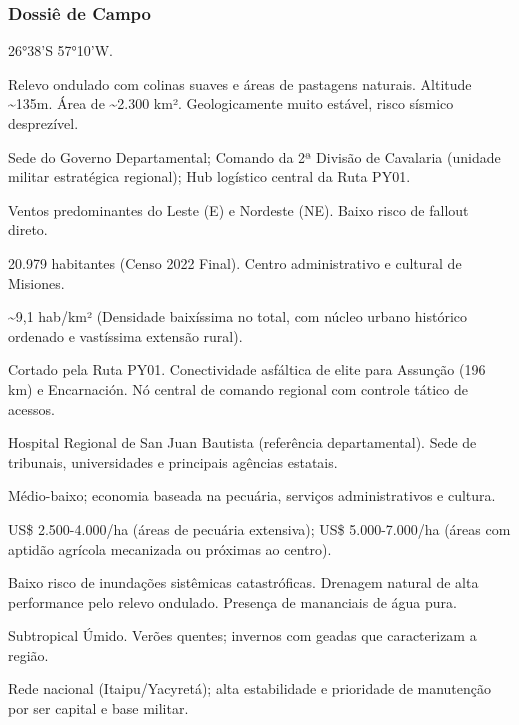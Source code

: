 \subsubsection{Dossiê de Campo}
\begin{description}[style=nextline,leftmargin=0.5cm,font=\bfseries]
\item[Coordenadas]  26°38'S 57°10'W.
\item[Topografia]  Relevo ondulado com colinas suaves e áreas de pastagens naturais. Altitude \textasciitilde 135m. Área de \textasciitilde 2.300 km². Geologicamente muito estável, risco sísmico desprezível.
\item[Alvos Estratégicos]  Sede do Governo Departamental; Comando da 2ª Divisão de Cavalaria (unidade militar estratégica regional); Hub logístico central da Ruta PY01.
\item[Fallout]  Ventos predominantes do Leste (E) e Nordeste (NE). Baixo risco de fallout direto.
\item[População]  20.979 habitantes (Censo 2022 Final). Centro administrativo e cultural de Misiones.
\item[Densidade]  \textasciitilde 9,1 hab/\allowbreak km² (Densidade baixíssima no total, com núcleo urbano histórico ordenado e vastíssima extensão rural).
\item[Vias de Acesso]  Cortado pela Ruta PY01. Conectividade asfáltica de elite para Assunção (196 km) e Encarnación. Nó central de comando regional com controle tático de acessos.
\item[Serviços]  Hospital Regional de San Juan Bautista (referência departamental). Sede de tribunais, universidades e principais agências estatais.
\item[Custo de Vida]  Médio-baixo; economia baseada na pecuária, serviços administrativos e cultura.
\item[Preço da Terra]  US\$ 2.500-4.000/\allowbreak ha (áreas de pecuária extensiva); US\$ 5.000-7.000/\allowbreak ha (áreas com aptidão agrícola mecanizada ou próximas ao centro).
\item[Hidrologia]  Baixo risco de inundações sistêmicas catastróficas. Drenagem natural de alta performance pelo relevo ondulado. Presença de mananciais de água pura.
\item[Clima]  Subtropical Úmido. Verões quentes; invernos com geadas que caracterizam a região.
\item[Energia]  Rede nacional (Itaipu/\allowbreak Yacyretá); alta estabilidade e prioridade de manutenção por ser capital e base militar.

\end{description}
